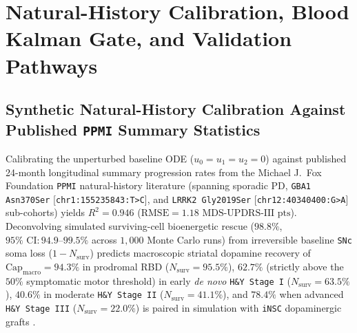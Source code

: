 \documentclass[11pt]{article}
\theoremstyle{plain}
\begin{document}
\section{Natural-History Calibration, Blood Kalman Gate, and Validation Pathways}

\subsection{Synthetic Natural-History Calibration Against Published \texttt{PPMI} Summary Statistics}
Calibrating the unperturbed baseline ODE ($u_0=u_1=u_2=0$) against published 24-month longitudinal summary progression rates from the Michael J.\ Fox Foundation \texttt{PPMI} natural-history literature (spanning sporadic PD, \texttt{GBA1 Asn370Ser} [\texttt{chr1:155235843:T>C}], and \texttt{LRRK2 Gly2019Ser} [\texttt{chr12:40340400:G>A}] sub-cohorts) \cite{marek2018ppmi,siderowf2023assessment} yields $R^2 = 0.946$ ($\mathrm{RMSE} = 1.18\text{ MDS-UPDRS-III pts}$). Deconvolving simulated surviving-cell bioenergetic rescue ($98.8\%$, $95\%\text{ CI}: 94.9\text{--}99.5\%$ across $1{,}000$ Monte Carlo runs) from irreversible baseline \texttt{SNc} soma loss ($1 - N_{\mathrm{surv}}$) predicts macroscopic striatal dopamine recovery of $\mathrm{Cap}_{\mathrm{macro}} = 94.3\%$ in prodromal RBD ($N_{\mathrm{surv}}=95.5\%$), $\mathbf{62.7\%}$ (strictly above the $50\%$ symptomatic motor threshold) in early \textit{de novo} \texttt{H\&Y Stage I} ($N_{\mathrm{surv}}=63.5\%$), $40.6\%$ in moderate \texttt{H\&Y Stage II} ($N_{\mathrm{surv}}=41.1\%$), and $\mathbf{78.4\%}$ when advanced \texttt{H\&Y Stage III} ($N_{\mathrm{surv}}=22.0\%$) is paired in simulation with \texttt{iNSC} dopaminergic grafts \cite{berg2026epigenetic}.
\end{document}
